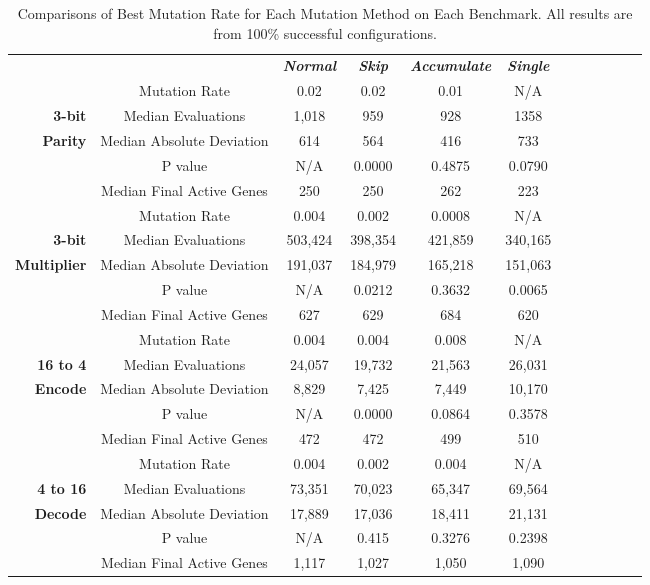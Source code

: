 \documentclass[runningheads,a4paper]{llncs}
\begin{document}
\begin{table}
	\centering
	\caption{Comparisons of Best Mutation Rate for Each Mutation Method on Each Benchmark.
	  All results are from 100\% successful configurations.}
	\begin{tabular}{r|c|c|c|c|c|c|c|c|c|c|c|}
	  \cline{3-6}
		 \multicolumn{2}{r|}{}    & \textbf{\emph{Normal}} & \textbf{\emph{Skip}} & \textbf{\emph{Accumulate}} & \textbf{\emph{Single}} \\ \cline{2-6} 
		                    & Mutation Rate & 0.02 & 0.02 & 0.01 & N/A \\ \cline{2-6}
	       \textbf{3-bit} & Median Evaluations & 1,018 & 959 & 928 & 1358 \\ \cline{2-6}
        \textbf{Parity} & Median Absolute Deviation & 614 & 564 & 416 & 733 \\ \cline{2-6}
	                      & P value  & N/A & 0.0000 & 0.4875 & 0.0790 \\ \cline{2-6}
	                      & Median Final Active Genes & 250 & 250 & 262 & 223 \\ \hhline{~=====}

		                    & Mutation Rate & 0.004 & 0.002 & 0.0008 & N/A \\ \cline{2-6}
	       \textbf{3-bit} & Median Evaluations & 503,424 & 398,354 & 421,859 & 340,165 \\ \cline{2-6}
	  \textbf{Multiplier} & Median Absolute Deviation & 191,037 & 184,979 & 165,218 & 151,063 \\ \cline{2-6}
	                      & P value  & N/A & 0.0212 & 0.3632 & 0.0065 \\ \cline{2-6}
	                      & Median Final Active Genes & 627 & 629 & 684 & 620 \\ \hhline{~=====}

                        & Mutation Rate & 0.004 & 0.004 & 0.008 & N/A \\ \cline{2-6}
	     \textbf{16 to 4} & Median Evaluations & 24,057 & 19,732 & 21,563 & 26,031 \\ \cline{2-6}
	      \textbf{Encode} & Median Absolute Deviation & 8,829 & 7,425 & 7,449 & 10,170 \\ \cline{2-6}
	                      & P value  & N/A & 0.0000 & 0.0864 & 0.3578 \\ \cline{2-6}
	                      & Median Final Active Genes & 472 & 472 & 499 & 510 \\ \hhline{~=====}

	                      & Mutation Rate & 0.004 & 0.002 & 0.004 & N/A \\ \cline{2-6} \cline{2-6}
       \textbf{4 to 16} & Median Evaluations & 73,351 & 70,023 & 65,347 & 69,564 \\ \cline{2-6}
        \textbf{Decode} & Median Absolute Deviation & 17,889 & 17,036 & 18,411 & 21,131 \\ \cline{2-6}
	                      & P value  & N/A & 0.415 & 0.3276 & 0.2398 \\ \cline{2-6}
	                      & Median Final Active Genes & 1,117 & 1,027 & 1,050 & 1,090 \\ \cline{2-6}


\end{tabular}
\end{table}
\end{document}
